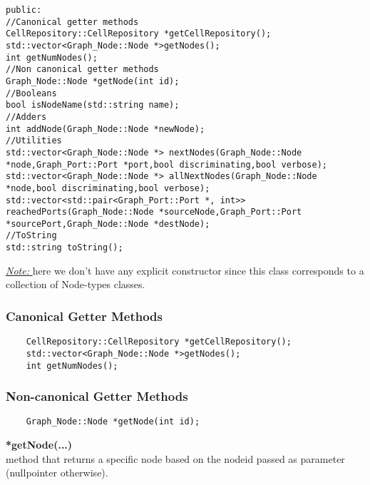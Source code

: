 \documentclass{article}
\begin{document}
\begin{mdframed}[hidealllines=true, backgroundcolor=magenta!10]
	\begin{lstlisting}[basicstyle=\tiny]
public:
//Canonical getter methods
CellRepository::CellRepository *getCellRepository();
std::vector<Graph_Node::Node *>getNodes();
int getNumNodes();
//Non canonical getter methods
Graph_Node::Node *getNode(int id);
//Booleans
bool isNodeName(std::string name);
//Adders
int addNode(Graph_Node::Node *newNode);
//Utilities
std::vector<Graph_Node::Node *> nextNodes(Graph_Node::Node *node,Graph_Port::Port *port,bool discriminating,bool verbose);
std::vector<Graph_Node::Node *> allNextNodes(Graph_Node::Node *node,bool discriminating,bool verbose);
std::vector<std::pair<Graph_Port::Port *, int>> reachedPorts(Graph_Node::Node *sourceNode,Graph_Port::Port *sourcePort,Graph_Node::Node *destNode);
//ToString
std::string toString();
	\end{lstlisting}
\end{mdframed}

\underline{\textit{Note: }} 
here we don't have any explicit constructor since this class corresponds to a collection of Node-types classes.\\

\subsubsection{Canonical Getter Methods}

\begin{mdframed}[hidealllines=true, backgroundcolor=magenta!10]
	\begin{lstlisting}
	CellRepository::CellRepository *getCellRepository();
	std::vector<Graph_Node::Node *>getNodes();
	int getNumNodes();
	\end{lstlisting}
\end{mdframed}

\subsubsection{Non-canonical Getter Methods}

\begin{mdframed}[hidealllines=true, backgroundcolor=magenta!10]
	\begin{lstlisting}
	Graph_Node::Node *getNode(int id);
	\end{lstlisting}
\end{mdframed}

\textbf{*getNode(...)}\\
method that returns a specific node based on the nodeid passed as parameter (nullpointer otherwise).\\\\
\end{document}
